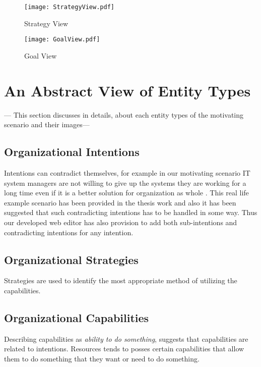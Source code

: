 \begin{figure}
	\centering
	\texttt{[image: StrategyView.pdf]}
	\caption{Strategy View}
	\label{fig:strategyview}
\end{figure}

\begin{figure}
	\centering
	\texttt{[image: GoalView.pdf]}
	\caption{Goal View}
	\label{fig:goalview}
\end{figure}

\section{An Abstract View of Entity Types}
\label{sec:entities}
 --- This section discusses in details, about each entity types of the motivating scenario and 
 their images---
 

\subsection{Organizational Intentions} 
\label{sec:intentions}
Intentions can contradict themselves, for example in our motivating scenario IT system managers are not willing to give up the systems they are working for a long time even if it is a better solution for organization as whole . This real life example scenario has been provided in the thesis work \cite{Sierr2015} and also it has been suggested that such contradicting intentions has to be handled in some way. Thus our developed web editor has also provision to add both sub-intentions and contradicting intentions for any intention.  


\subsection{Organizational Strategies} 
\label{sec:strategies}
Strategies are used to identify the most appropriate method of utilizing the capabilities. 


\subsection{Organizational Capabilities}
\label{sec:capabilities}
Describing  capabilities as \textit{ability to do something}, suggests that capabilities are related to intentions. Resources tends to posses certain capabilities that allow them to do something that they want or need to do something. 



